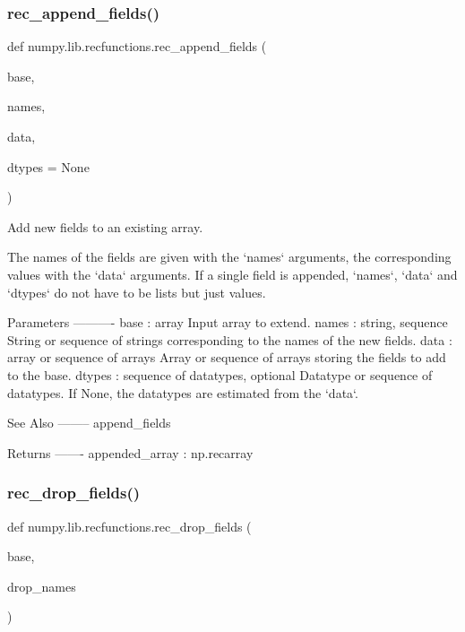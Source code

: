 \subsubsection{\texorpdfstring{rec\+\_\+append\+\_\+fields()}{rec\_append\_fields()}}
{\footnotesize\ttfamily def numpy.\+lib.\+recfunctions.\+rec\+\_\+append\+\_\+fields (\begin{DoxyParamCaption}\item[{}]{base,  }\item[{}]{names,  }\item[{}]{data,  }\item[{}]{dtypes = {\ttfamily None} }\end{DoxyParamCaption})}

\begin{DoxyVerb}Add new fields to an existing array.

The names of the fields are given with the `names` arguments,
the corresponding values with the `data` arguments.
If a single field is appended, `names`, `data` and `dtypes` do not have
to be lists but just values.

Parameters
----------
base : array
    Input array to extend.
names : string, sequence
    String or sequence of strings corresponding to the names
    of the new fields.
data : array or sequence of arrays
    Array or sequence of arrays storing the fields to add to the base.
dtypes : sequence of datatypes, optional
    Datatype or sequence of datatypes.
    If None, the datatypes are estimated from the `data`.

See Also
--------
append_fields

Returns
-------
appended_array : np.recarray
\end{DoxyVerb}
 \mbox{\label{namespacenumpy_1_1lib_1_1recfunctions_a3c0a086ab91ef24162647b57675e8958}} 
\subsubsection{\texorpdfstring{rec\+\_\+drop\+\_\+fields()}{rec\_drop\_fields()}}
{\footnotesize\ttfamily def numpy.\+lib.\+recfunctions.\+rec\+\_\+drop\+\_\+fields (\begin{DoxyParamCaption}\item[{}]{base,  }\item[{}]{drop\+\_\+names }\end{DoxyParamCaption})}

